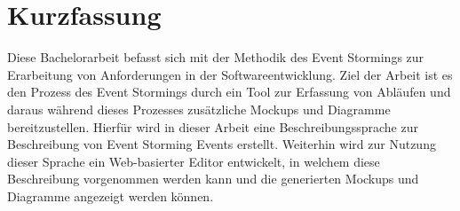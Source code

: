 \chapter*{Kurzfassung}

Diese Bachelorarbeit befasst sich mit der Methodik des Event Stormings zur Erarbeitung von Anforderungen in der Softwareentwicklung.
Ziel der Arbeit ist es den Prozess des Event Stormings durch ein Tool zur Erfassung von Abläufen und daraus während dieses Prozesses
zusätzliche Mockups und Diagramme bereitzustellen.
Hierfür wird in dieser Arbeit eine Beschreibungssprache zur Beschreibung von Event Storming Events erstellt.
Weiterhin wird zur Nutzung dieser Sprache ein Web-basierter Editor entwickelt, in welchem diese Beschreibung vorgenommen werden kann und
die generierten Mockups und Diagramme angezeigt werden können.